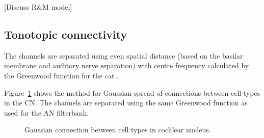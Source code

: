[Discuss R\&M model]


\subsection{Tonotopic connectivity}\label{sec:tonot-conn}

The channels are separated using even spatial distance (based on the
basilar membrane and auditory nerve separation) with centre frequency
calculated by the Greenwood function for the cat
\citep{Greenwood:1990}. 


Figure~\ref{fig:CNconn} shows the method for Gaussian spread of
connections between cell types in the CN\@.  The channels are separated
using the same Greenwood function as used for the AN filterbank.


\begin{figure}[tbh]
  \begin{center}
    \caption{Gaussian connection between cell types in cochlear
      nucleus.}
    \label{fig:CNconn}
  \end{center}
\end{figure}






